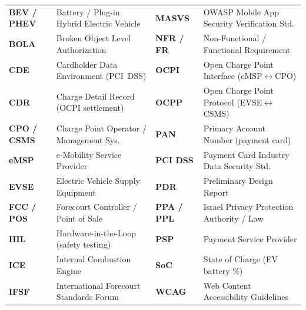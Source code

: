\vspace{3pt}
\noindent
{\footnotesize
\begin{tabularx}{\linewidth}{@{}P{18mm} L P{18mm} L@{}}
  \toprule
   &  &  &  \\
  \midrule
  \textbf{BEV / PHEV} & Battery / Plug-in Hybrid Electric Vehicle & \textbf{MASVS} & OWASP Mobile App Security Verification Std. \\
  \textbf{BOLA} & Broken Object Level Authorization & \textbf{NFR / FR} & Non-Functional / Functional Requirement \\
  \textbf{CDE} & Cardholder Data Environment (PCI~DSS) & \textbf{OCPI} & Open Charge Point Interface (eMSP$\leftrightarrow$CPO) \\
  \textbf{CDR} & Charge Detail Record (OCPI settlement) & \textbf{OCPP} & Open Charge Point Protocol (EVSE$\leftrightarrow$CSMS) \\
  \textbf{CPO / CSMS} & Charge Point Operator / Management Sys. & \textbf{PAN} & Primary Account Number (payment card) \\
  \textbf{eMSP} & e-Mobility Service Provider & \textbf{PCI DSS} & Payment Card Industry Data Security Std. \\
  \textbf{EVSE} & Electric Vehicle Supply Equipment & \textbf{PDR} & Preliminary Design Report \\
  \textbf{FCC / POS} & Forecourt Controller / Point of Sale & \textbf{PPA / PPL} & Israel Privacy Protection Authority / Law \\
  \textbf{HIL} & Hardware-in-the-Loop (safety testing) & \textbf{PSP} & Payment Service Provider \\
  \textbf{ICE} & Internal Combustion Engine & \textbf{SoC} & State of Charge (EV battery \%) \\
  \textbf{IFSF} & International Forecourt Standards Forum & \textbf{WCAG} & Web Content Accessibility Guidelines \\
  \bottomrule
\end{tabularx}
}
